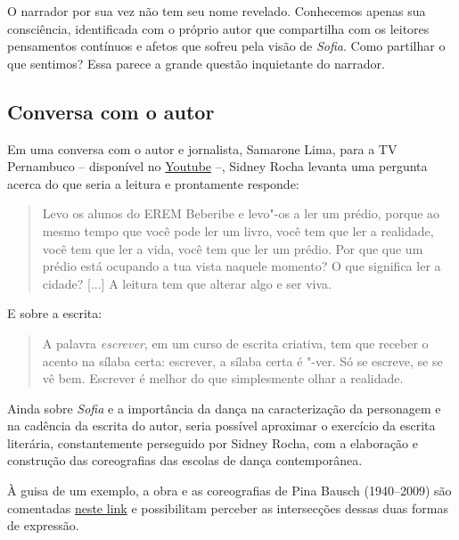 \documentclass[12pt]{extarticle}
\begin{document}
O narrador por sua vez não tem seu nome revelado. Conhecemos apenas sua
consciência, identificada com o próprio autor
que compartilha com os leitores pensamentos contínuos e afetos que sofreu
pela visão de \textit{Sofia}. Como partilhar o que sentimos? 
Essa parece a grande questão inquietante do narrador.  

\subsection{Conversa com o autor}

Em uma conversa com o autor e jornalista, Samarone Lima, para a TV Pernambuco --
disponível no  
\href{https://www.youtube.com/watch?v=wLNc8aGLM5Q&ab_channel=TVPernambuco}{Youtube} --, Sidney Rocha 
levanta uma pergunta acerca do que seria a leitura e prontamente responde:

 \begin{quote}

Levo os alunos do EREM Beberibe e levo"-os a ler um prédio, porque ao mesmo tempo 
que você pode ler um livro, você tem que ler a realidade, você tem que ler a vida, 
você tem que ler um prédio. 
Por que que um prédio está ocupando a tua vista naquele momento? 
O que significa ler a cidade? 
{[}...{]}
A leitura tem que alterar algo e ser viva. 

\end{quote} 

E sobre a escrita: 

\begin{quote}

A palavra \textit{escrever}, em um curso de escrita criativa, tem que receber o acento 
na sílaba certa: escrever, a sílaba certa é "-ver.
Só se escreve, se se vê bem. 
Escrever é melhor do que simplesmente olhar a realidade. 

\end{quote} 

Ainda sobre \textit{Sofia} e a importância da dança na caracterização da personagem e na 
cadência da escrita do autor, seria possível aproximar o exercício da escrita literária, 
constantemente perseguido por Sidney Rocha, com a elaboração e construção das coreografias 
das escolas de dança contemporânea. 

À guisa de um exemplo, a obra e as coreografias de Pina Bausch (1940--2009) são comentadas 
\href{https://www.youtube.com/watch?v=hh8cUsdz1fU&ab_channel=AndresNeumann}{neste link} e 
possibilitam perceber as intersecções dessas duas formas de expressão. 
\end{document}
